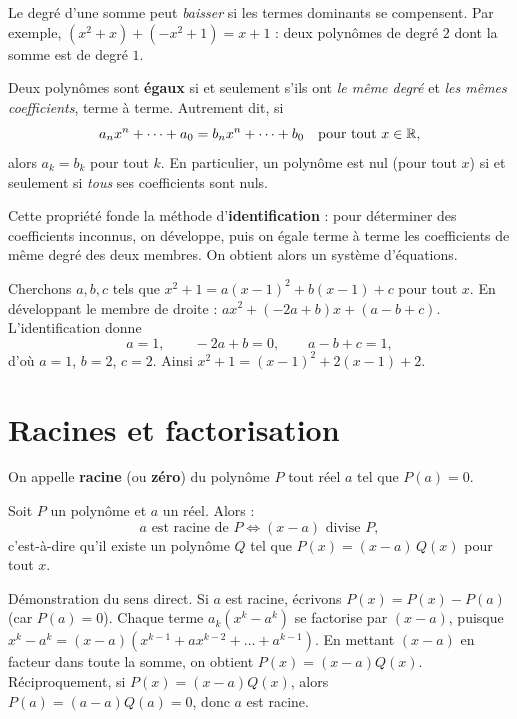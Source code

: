 \begin{remarque}
Le degré d'une somme peut \emph{baisser} si les termes dominants se compensent. Par
exemple, $(x^2+x)+(-x^2+1)=x+1$ : deux polynômes de degré $2$ dont la somme est de
degré $1$.
\end{remarque}

\begin{theoreme}
Deux polynômes sont \textbf{égaux} si et seulement s'ils ont \emph{le même degré} et
\emph{les mêmes coefficients}, terme à terme. Autrement dit, si
\[ a_n x^n+\dots+a_0 = b_n x^n+\dots+b_0 \quad\text{pour tout }x\in\mathbb{R}, \]
alors $a_k=b_k$ pour tout $k$. En particulier, un polynôme est nul (pour tout $x$) si et
seulement si \emph{tous} ses coefficients sont nuls.
\end{theoreme}

\begin{aretenir}
Cette propriété fonde la méthode d'\textbf{identification} : pour déterminer des
coefficients inconnus, on développe, puis on égale terme à terme les coefficients de
même degré des deux membres. On obtient alors un système d'équations.
\end{aretenir}

\begin{exemple}
Cherchons $a,b,c$ tels que $x^2+1=a(x-1)^2+b(x-1)+c$ pour tout $x$. En développant le
membre de droite : $a x^2+(-2a+b)x+(a-b+c)$. L'identification donne
\[ a=1,\qquad -2a+b=0,\qquad a-b+c=1, \]
d'où $a=1$, $b=2$, $c=2$. Ainsi $x^2+1=(x-1)^2+2(x-1)+2$.
\end{exemple}

\section{Racines et factorisation}

\begin{definition}
On appelle \textbf{racine} (ou \textbf{zéro}) du polynôme $P$ tout réel $a$ tel que
$P(a)=0$.
\end{definition}

\begin{theoreme}
Soit $P$ un polynôme et $a$ un réel. Alors :
\[ a \text{ est racine de } P \iff (x-a) \text{ divise } P, \]
c'est-à-dire qu'il existe un polynôme $Q$ tel que $P(x)=(x-a)\,Q(x)$ pour tout $x$.
\end{theoreme}

\begin{remarque}
Démonstration du sens direct. Si $a$ est racine, écrivons $P(x)=P(x)-P(a)$ (car
$P(a)=0$). Chaque terme $a_k(x^k-a^k)$ se factorise par $(x-a)$, puisque
$x^k-a^k=(x-a)(x^{k-1}+ax^{k-2}+\dots+a^{k-1})$. En mettant $(x-a)$ en facteur dans
toute la somme, on obtient $P(x)=(x-a)Q(x)$. Réciproquement, si $P(x)=(x-a)Q(x)$, alors
$P(a)=(a-a)Q(a)=0$, donc $a$ est racine.
\end{remarque}

